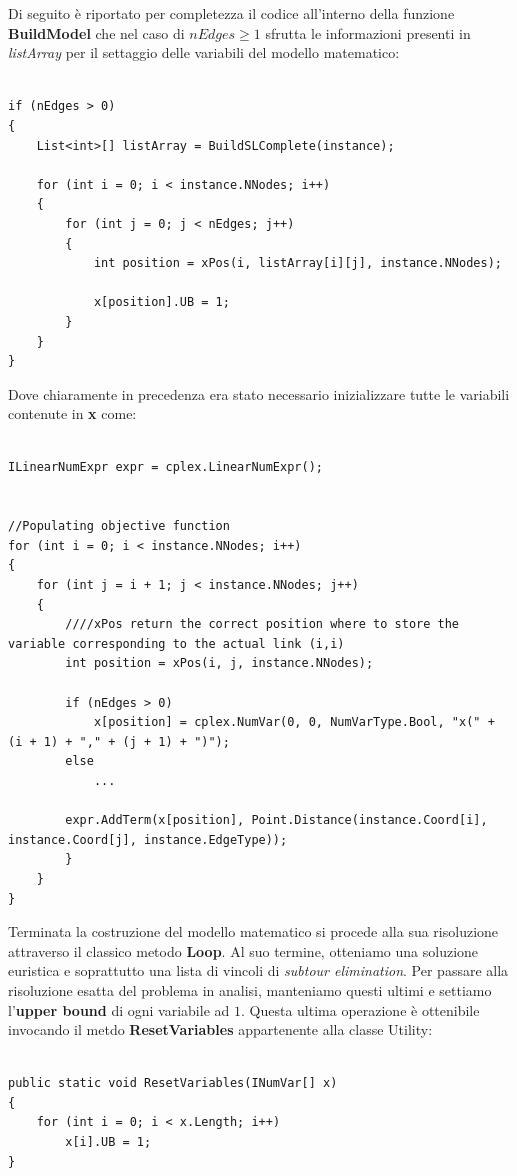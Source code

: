 \documentclass[11pt]{article}
\begin{document}
Di seguito è riportato per completezza il codice all'interno della funzione \textbf{BuildModel} che nel caso di $nEdges \geqslant 1$ sfrutta le informazioni presenti in \textit{listArray} per il settaggio delle variabili del modello matematico:

\begin{lstlisting}

if (nEdges > 0)
{
    List<int>[] listArray = BuildSLComplete(instance);

    for (int i = 0; i < instance.NNodes; i++)
    {
        for (int j = 0; j < nEdges; j++)
        {
            int position = xPos(i, listArray[i][j], instance.NNodes);

            x[position].UB = 1;
        }
    }
}

\end{lstlisting}

Dove chiaramente in precedenza era stato necessario inizializzare tutte le variabili contenute in \textbf{x} come:

\begin{lstlisting}

ILinearNumExpr expr = cplex.LinearNumExpr();


//Populating objective function
for (int i = 0; i < instance.NNodes; i++)
{
    for (int j = i + 1; j < instance.NNodes; j++)
    {
        ////xPos return the correct position where to store the variable corresponding to the actual link (i,i)
        int position = xPos(i, j, instance.NNodes);

        if (nEdges > 0)
            x[position] = cplex.NumVar(0, 0, NumVarType.Bool, "x(" + (i + 1) + "," + (j + 1) + ")");
        else
            ...

        expr.AddTerm(x[position], Point.Distance(instance.Coord[i], instance.Coord[j], instance.EdgeType));
        }
    }
}

\end{lstlisting}

Terminata la costruzione del modello matematico si procede alla sua risoluzione attraverso il classico metodo \textbf{Loop}. Al suo termine, otteniamo una soluzione euristica e soprattutto una lista di vincoli di \textit{subtour elimination}. Per passare alla risoluzione esatta del problema in analisi, manteniamo questi ultimi e settiamo l'\textbf{upper bound} di ogni variabile ad $1$. Questa ultima operazione è ottenibile invocando il metdo \textbf{ResetVariables} appartenente alla classe Utility:


\begin{lstlisting}

public static void ResetVariables(INumVar[] x)
{
    for (int i = 0; i < x.Length; i++)
        x[i].UB = 1;
}

\end{lstlisting}
\end{document}
